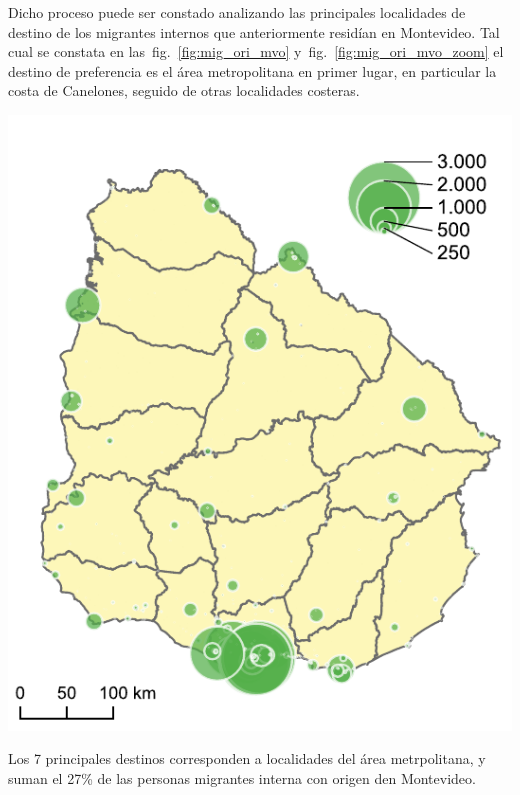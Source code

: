 \documentclass[12pt,spanish,]{article}
\let\origfigure\figure
\let\endorigfigure\endfigure
\renewenvironment{figure}[1][2] {
    \expandafter\origfigure\expandafter[H]
} {
    \endorigfigure
}
\begin{document}
Dicho proceso puede ser constado analizando las principales localidades
de destino de los migrantes internos que anteriormente residían en
Montevideo. Tal cual se constata en las~fig.~\ref{fig:mig_ori_mvo}
y~fig.~\ref{fig:mig_ori_mvo_zoom} el destino de preferencia es el área
metropolitana en primer lugar, en particular la costa de Canelones,
seguido de otras localidades costeras.

\begin{figure}
\hypertarget{fig:mig_ori_mvo}{%
\centering
\includegraphics{./tex2pdf.-8c1f0593c1a83dbe/b9bc0fc10fd24a0e7eba94d94096c420d1bf6fa5.pdf}
\caption{Migrantes internos con origen en
Montevideo}\label{fig:mig_ori_mvo}
}
\end{figure}

Los 7 principales destinos corresponden a localidades del área
metrpolitana, y suman el 27\% de las personas migrantes interna con
origen den Montevideo.
\end{document}
